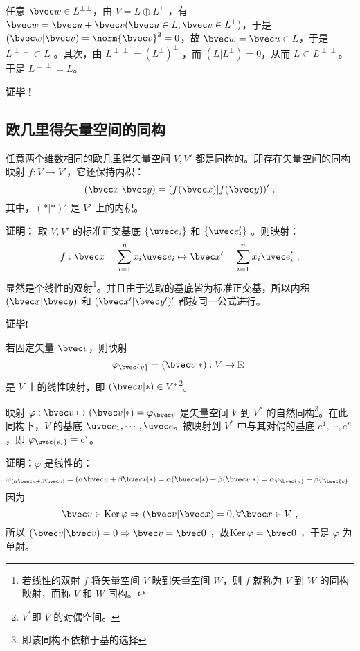 任意 $\bvec w\in L^{\perp\perp}$，由 $V=L\oplus L^{\perp}$ ，有 $\bvec w=\bvec u+\bvec v(\bvec u\in L,\bvec v\in L^{\perp})$，于是 $(\bvec w|\bvec v)=\norm{\bvec v}^2=0$，故 $\bvec w=\bvec u\in L$，于是 $L^{\perp\perp}\subset L$ 。其次，由 $L^{\perp\perp}=(L^{\perp})^{\perp}$ ，而 $(L|L^{\perp})=0$，从而 $L\subset L^{\perp\perp}$。于是 $L^{\perp\perp}=L$。

\textbf{证毕！}
\subsection{欧几里得矢量空间的同构}
\begin{theorem}{}
任意两个维数相同的欧几里得矢量空间 $V,V'$ 都是同构的。即存在矢量空间的同构映射 $f:V\rightarrow V'$，它还保持内积：
\begin{equation}
(\bvec x|\bvec y)=(f(\bvec x)|f(\bvec y))'~.
\end{equation}
其中，$(*|*)'$ 是 $V'$ 上的内积。
\end{theorem}
\textbf{证明：} 取 $V,V'$ 的标准正交基底 $\{\uvec e_i\}$ 和 $\{\uvec e'_i\}$ 。则映射：
\begin{equation}
f:\bvec x=\sum_{i=1}^{n}x_i\uvec e_i\mapsto\bvec x'=\sum_{i=1}^{n}x_i\uvec e'_i~,
\end{equation}
显然是个线性的双射\footnote{若线性的双射 $f$ 将矢量空间 $V$ 映到矢量空间 $W$，则 $f$ 就称为 $V$ 到 $W$ 的同构映射，而称 $V$ 和 $W$ 同构。}。并且由于选取的基底皆为标准正交基，所以内积 $(\bvec x|\bvec y)$ 和 $(\bvec x'|\bvec y')'$ 都按同一公式进行。

\textbf{证毕!}

若固定矢量 $\bvec v$，则映射
\begin{equation}
\varphi_{\bvec{v}}=(\bvec v|*):V\rightarrow\mathbb{R}~
\end{equation}
是 $V$ 上的线性映射，即 $(\bvec v|*)\in V^*$\footnote{$V^*$即 $V$ 的对偶空间。}。
\begin{theorem}{}\label{the_EVOIOG_3}
映射 $\varphi:\bvec v\mapsto (\bvec v|*)=\varphi_{\bvec v}$ 是矢量空间 $V$ 到 $V^*$ 的自然同构\footnote{即该同构不依赖于基的选择}。在此同构下，$V$ 的基底 $\uvec e_1,\cdots,\uvec e_n$ 被映射到 $V^*$ 中与其对偶的基底 $e^1,\cdots,e^n$，即 $\varphi_{\uvec{e_i}}=e^i$。
\end{theorem}
\textbf{证明：}$\varphi$ 是线性的：
\begin{equation}
\varphi_{(\alpha\bvec u+\beta\bvec v)}=(\alpha\bvec u+\beta\bvec v|*)=\alpha(\bvec u|*)+\beta(\bvec v|*)=\alpha\varphi_{\bvec{u}}+\beta\varphi_{\bvec{v}}~.
\end{equation}
因为 
\begin{equation}
\bvec v\in \mathrm{Ker}\,\varphi\Rightarrow(\bvec v|\bvec x)=0,\forall\bvec x\in V~,
\end{equation}
所以 $(\bvec v|\bvec v)=0\Rightarrow\bvec v=\bvec 0$ ，故$\mathrm{Ker}\,\varphi=\bvec 0$ ，于是 $\varphi$ 为单射。

